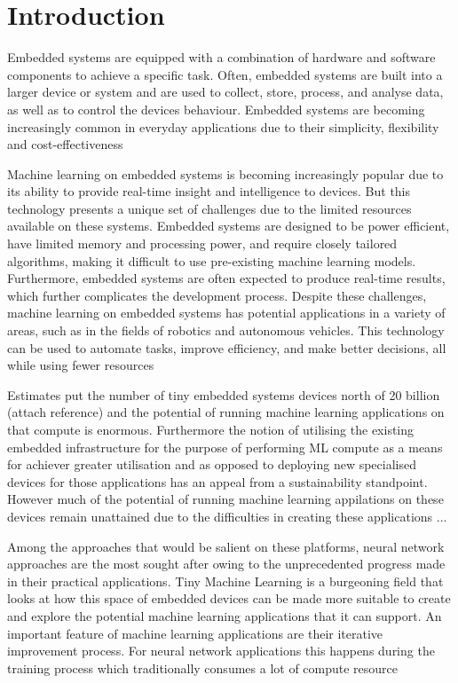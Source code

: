 \part{Introduction}

Embedded systems are equipped with a combination of hardware and software components to achieve a specific task. Often, embedded systems are built into a larger device or system and are used to collect, store, process, and analyse data, as well as to control the device\textquotesingle s behaviour. Embedded systems are becoming increasingly common in everyday applications due to their simplicity, flexibility and cost-effectiveness

Machine learning on embedded systems is becoming increasingly popular due to its ability to provide real-time insight and intelligence to devices. But this technology presents a unique set of challenges due to the limited resources available on these systems. Embedded systems are designed to be power efficient, have limited memory and processing power, and require closely tailored algorithms, making it difficult to use pre-existing machine learning models. Furthermore, embedded systems are often expected to produce real-time results, which further complicates the development process. Despite these challenges, machine learning on embedded systems has potential applications in a variety of areas, such as in the fields of robotics and autonomous vehicles. This technology can be used to automate tasks, improve efficiency, and make better decisions, all while using fewer resources

Estimates put the number of tiny embedded systems devices north of 20 billion (attach reference) and the potential of running machine learning applications on that compute is enormous. Furthermore the notion of utilising the existing embedded infrastructure for the purpose of performing ML compute as a means for achiever greater utilisation and as opposed to deploying new specialised devices for those applications has an appeal from a sustainability standpoint. However much of the potential of running machine learning appilations on these devices remain unattained due to the difficulties in creating these applications ...

Among the approaches that would be salient on these platforms, neural network approaches are the most sought after owing to the unprecedented progress made in their practical applications. Tiny Machine Learning is a burgeoning field that looks at how this space of embedded devices can be made more suitable to create and explore the potential machine learning applications that it can support. An important feature of machine learning applications are their iterative improvement process. For neural network applications this happens during the training process which traditionally consumes a lot of compute resource

